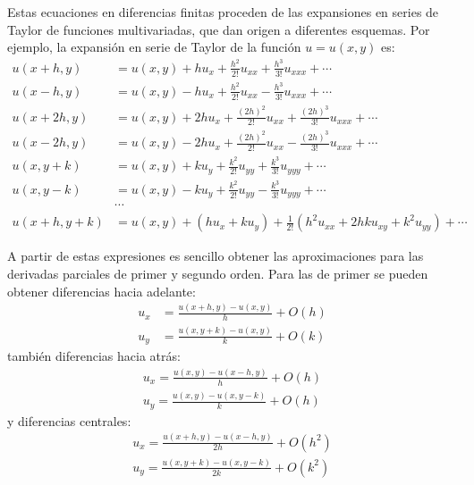 Estas ecuaciones en diferencias finitas proceden de las expansiones en series de Taylor de funciones multivariadas, que dan origen a diferentes esquemas. Por ejemplo, la expansión en serie de Taylor de la función $u = u(x,y)$ es:
\begin{align*}
 u(x + h, y) &= u(x,y) + h u_x + \frac{h^2}{2!} u_{xx} + \frac{h^3}{3!} u_{xxx} + \cdots \\
 u(x - h, y) &= u(x,y) - h u_x + \frac{h^2}{2!} u_{xx} - \frac{h^3}{3!} u_{xxx} + \cdots \\
 u(x + 2h, y) &= u(x,y) + 2h u_x + \frac{(2h)^2}{2!} u_{xx} + \frac{(2h)^3}{3!} u_{xxx} + \cdots \\
 u(x - 2h, y) &= u(x,y) - 2h u_x + \frac{(2h)^2}{2!} u_{xx} - \frac{(2h)^3}{3!} u_{xxx} + \cdots \\
 u(x, y + k) &= u(x,y) + k u_y + \frac{k^2}{2!} u_{yy} + \frac{k^3}{3!} u_{yyy} + \cdots \\
 u(x, y - k) &= u(x,y) - k u_y + \frac{k^2}{2!} u_{yy} - \frac{k^3}{3!} u_{yyy} + \cdots \\
            &\cdots \\
 u(x + h, y +k) &= u(x,y) + (h u_x + k u_y) + \frac{1}{2!} (h^2 u_{xx} + 2 h k u_{xy} + k^2 u_{yy}) + \cdots
 \end{align*}
 
 A partir de estas expresiones es sencillo obtener las aproximaciones para las derivadas parciales de primer y segundo orden. Para las de primer se pueden obtener diferencias hacia adelante:
\begin{align*}
 u_x &= \frac{u(x + h, y) - u(x,y)}{h} + O(h) \\
 u_y &= \frac{u(x, y + k) - u(x,y)}{k} + O(k)
\end{align*}
también diferencias hacia atrás:
\begin{align*}
 u_x = \frac{u(x,y) - u(x-h,y)}{h} + O(h) \\
 u_y = \frac{u(x,y) - u(x,y-k)}{k} + O(h) 
\end{align*}
y diferencias centrales:
\begin{align*}
 u_x = \frac{u(x+h, y) - u(x-h,y)}{2 h} + O(h^2) \\
 u_y = \frac{u(x, y +k) - u(x,y -k)}{2 k} + O(k^2)
\end{align*}

